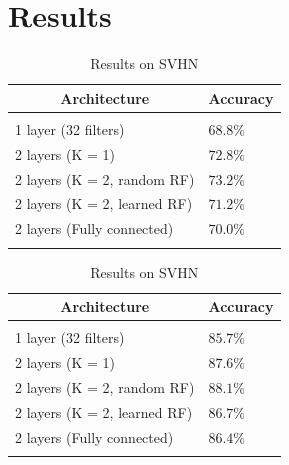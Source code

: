 \documentclass{article} %
\begin{document}


\section{Results}
\label{sec-results}

\begin {table}
\parbox{.5\linewidth}{
\caption{Results on CIFAR-10}
\label{tab:results-cifar10}
\begin{center}
\begin{tabular}{ll}
\multicolumn{1}{c}{\bf Architecture}  &\multicolumn{1}{c}{\bf Accuracy}
 \\ \hline \hline \\
1 layer (32 filters)			& $68.8\%$\\
2 layers (K = 1)				&$72.8\%$ \\
2 layers (K = 2, random RF)	&$73.2\%$ \\
2 layers (K = 2, learned RF)	&$71.2\%$\\
2 layers (Fully connected)		&$70.0\%$\\
\\ \hline  \hline
\end{tabular}
\end{center}
}
\parbox{.5\linewidth}{
\caption{Results on SVHN}
\label{tab:results-svhn}
\begin{center}
\begin{tabular}{ll}
\multicolumn{1}{c}{\bf Architecture}  &\multicolumn{1}{c}{\bf Accuracy}
\\ \hline \hline \\
1 layer (32 filters)			& $85.7\%$\\
2 layers (K = 1)                           &$87.6\%$ \\
2 layers (K = 2, random RF)	&$88.1\%$ \\
2 layers (K = 2, learned RF)	&$86.7\%$\\
2 layers (Fully connected)		&$86.4\%$\\
\\ \hline \hline
\end{tabular}
\end{center}
}
\end{table}
\end{document}
